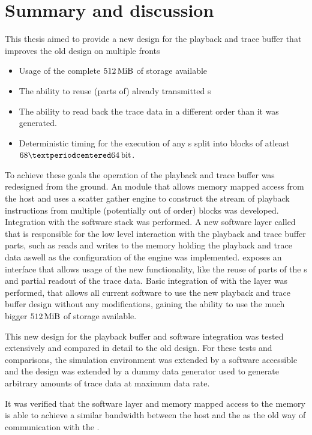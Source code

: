 \section{Summary and discussion}
This thesis aimed to provide a new design for the playback and trace buffer that improves the old design on multiple fronts
\begin{itemize}
\item Usage of the complete $\DDRSIZE{}$ of storage available
\item The ability to reuse (parts of) already transmitted \PlaybackProgram{}s
\item The ability to read back the trace data in a different order than it was generated.
\item Deterministic timing for the execution of any \PlaybackProgram{}s split into blocks of atleast $\num{68} · \PhyWordSize{}$.
\end{itemize}
To achieve these goals the operation of the playback and trace buffer was redesigned from the ground. An \FPGA{} module that allows memory mapped access from the host and uses a scatter gather \DMA{} engine to construct the stream of playback instructions from multiple (potentially out of order) blocks was developed. Integration with the \BSSTwo{} software stack was performed. A new software layer called \ayo{} that is responsible for the low level interaction with the playback and trace buffer parts, such as reads and writes to the \DDR{} memory holding the playback and trace data aswell as the configuration of the \DMA{} engine was implemented. \ayo{} exposes an interface that allows usage of the new functionality, like the reuse of parts of the \PlaybackProgram{}s and partial readout of the trace data. Basic integration of \ayo{} with the \hxcomm{} layer was performed, that allows all current software to use the new playback and trace buffer design without any modifications, gaining the ability to use the much bigger $\DDRSIZE{}$ of storage available.

This new design for the playback buffer and software integration was tested extensively and compared in detail to the old design. For these tests and comparisons, the simulation environment was extended by a software accessible \AXI{} \DRAM{} and the \FPGA{} design was extended by a dummy data generator used to generate arbitrary amounts of trace data at maximum data rate.

It was verified that the software layer and memory mapped access to the \DDR{} memory is able to achieve a similar bandwidth between the host and the \FPGA{} as the old way of communication with the \FPGA{}.

